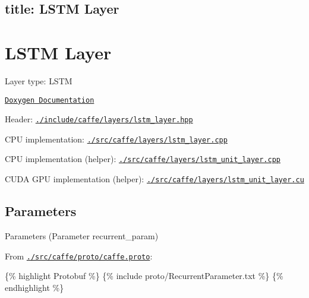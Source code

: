 

 \subsection*{title\+: L\+S\+TM Layer }

\section*{L\+S\+TM Layer}


\begin{DoxyItemize}
\item Layer type\+: {\ttfamily L\+S\+TM}
\item \href{http://caffe.berkeleyvision.org/doxygen/classcaffe_1_1LSTMLayer.html}{\tt Doxygen Documentation}
\item Header\+: \href{https://github.com/BVLC/caffe/blob/master/include/caffe/layers/lstm_layer.hpp}{\tt {\ttfamily ./include/caffe/layers/lstm\+\_\+layer.hpp}}
\item C\+PU implementation\+: \href{https://github.com/BVLC/caffe/blob/master/src/caffe/layers/lstm_layer.cpp}{\tt {\ttfamily ./src/caffe/layers/lstm\+\_\+layer.cpp}}
\item C\+PU implementation (helper)\+: \href{https://github.com/BVLC/caffe/blob/master/src/caffe/layers/lstm_unit_layer.cpp}{\tt {\ttfamily ./src/caffe/layers/lstm\+\_\+unit\+\_\+layer.cpp}}
\item C\+U\+DA G\+PU implementation (helper)\+: \href{https://github.com/BVLC/caffe/blob/master/src/caffe/layers/lstm_unit_layer.cu}{\tt {\ttfamily ./src/caffe/layers/lstm\+\_\+unit\+\_\+layer.cu}}
\end{DoxyItemize}

\subsection*{Parameters}


\begin{DoxyItemize}
\item Parameters ({\ttfamily Parameter recurrent\+\_\+param})
\item From \href{https://github.com/BVLC/caffe/blob/master/src/caffe/proto/caffe.proto}{\tt {\ttfamily ./src/caffe/proto/caffe.proto}}\+:
\end{DoxyItemize}

\{\% highlight Protobuf \%\} \{\% include proto/\+Recurrent\+Parameter.\+txt \%\} \{\% endhighlight \%\} 